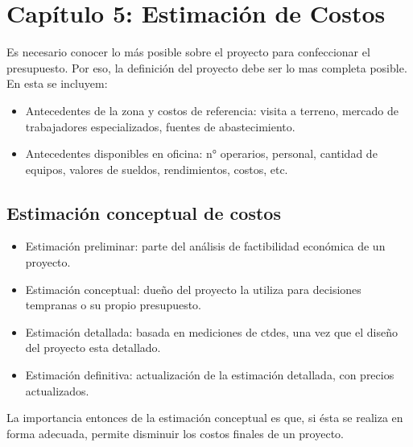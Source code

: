 \section{Capítulo 5: Estimación de Costos}

Es necesario conocer lo más posible sobre el proyecto para confeccionar el presupuesto. Por eso, la definición del proyecto debe ser lo mas completa posible. En esta se incluyem:

\begin{itemize}
    \item Antecedentes de la zona y costos de referencia: visita a terreno, mercado de trabajadores especializados, fuentes de abastecimiento.
    \item Antecedentes disponibles en oficina: n° operarios, personal, cantidad de equipos, valores de sueldos, rendimientos, costos, etc.
\end{itemize}

\subsection{Estimación conceptual de costos}

\begin{itemize}
    \item Estimación preliminar: parte del análisis de factibilidad económica de un proyecto.
    \item Estimación conceptual: dueño del proyecto la utiliza para decisiones tempranas o su propio presupuesto.
    \item Estimación detallada: basada en mediciones de ctdes, una vez que el diseño del proyecto esta detallado.
    \item Estimación definitiva: actualización de la estimación detallada, con precios actualizados.
\end{itemize}

La importancia entonces de la estimación conceptual es que, si ésta se realiza en forma adecuada, permite disminuir los costos finales de un proyecto.

